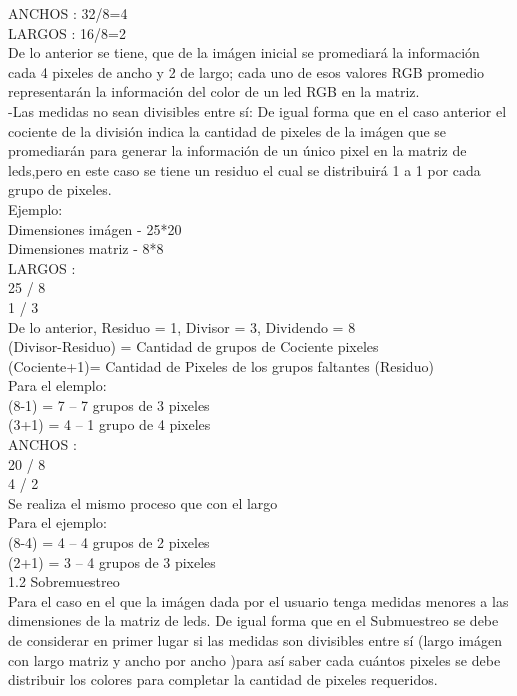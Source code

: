 \documentclass{article}
\begin{document}
  ANCHOS   : 32/8=4\\                 
  
  LARGOS  : 16/8=2\\
  
  De lo anterior se tiene, que de la imágen inicial se promediará la información cada 4 pixeles de ancho y 2 de largo; cada uno de esos valores RGB promedio representarán la información del color de un led RGB en la matriz.\\
  
  -Las medidas no sean divisibles entre sí: De igual forma que en el caso anterior el cociente de la división indica la cantidad de pixeles de la imágen que se promediarán para generar la información de un único pixel en la matriz de leds,pero en este caso se tiene un residuo el cual se distribuirá 1 a 1 por cada grupo de pixeles. \\
  
  Ejemplo:\\
  
  Dimensiones imágen - 25*20\\
  Dimensiones matriz - 8*8\\
  
  LARGOS : \\
  25 / 8  \\  
   1 / 3 \\
   
   De lo anterior, Residuo = 1, Divisor = 3, Dividendo = 8\\
   (Divisor-Residuo) = Cantidad de grupos de Cociente pixeles\\
   (Cociente+1)= Cantidad de Pixeles de los grupos faltantes (Residuo)\\
   
   Para el elemplo:\\
   (8-1) = 7 --  7 grupos de 3 pixeles\\
   (3+1) = 4 --  1 grupo de 4 pixeles\\
   
   
   ANCHOS : \\
   20 / 8 \\
   4 / 2 \\
   Se realiza el mismo proceso que con el largo\\
   Para el ejemplo:\\
   (8-4) = 4  --  4 grupos de 2 pixeles\\
   (2+1) = 3  --  4 grupos de 3 pixeles\\
   
   1.2 Sobremuestreo\\
   Para el caso en el que la imágen dada por el usuario tenga medidas menores a las dimensiones de la matriz de leds. De igual forma que en el Submuestreo se debe de considerar en primer lugar si las medidas son divisibles entre sí (largo imágen con largo matriz y ancho por ancho )para así saber cada cuántos pixeles se debe distribuir los colores para completar la cantidad de pixeles requeridos.
   
\end{document}
